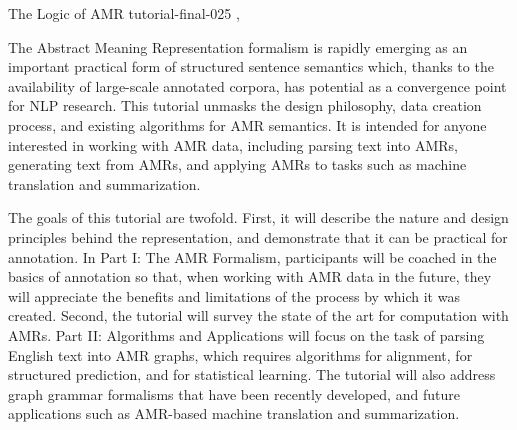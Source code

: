 \begin{tutorial}
  {The Logic of AMR}
  {tutorial-final-025}
  {\daydateyear, \tutorialmorningtime}
  {\TutLocC}

The Abstract Meaning Representation formalism is rapidly emerging as
an important practical form of structured sentence semantics which,
thanks to the availability of large-scale annotated corpora, has
potential as a convergence point for NLP research. This tutorial
unmasks the design philosophy, data creation process, and existing
algorithms for AMR semantics. It is intended for anyone interested in
working with AMR data, including parsing text into AMRs, generating
text from AMRs, and applying AMRs to tasks such as machine translation
and summarization.

The goals of this tutorial are twofold. First, it will describe the
nature and design principles behind the representation, and
demonstrate that it can be practical for annotation. In Part I: The
AMR Formalism, participants will be coached in the basics of
annotation so that, when working with AMR data in the future, they
will appreciate the benefits and limitations of the process by which
it was created. Second, the tutorial will survey the state of the art
for computation with AMRs. Part II: Algorithms and Applications will
focus on the task of parsing English text into AMR graphs, which
requires algorithms for alignment, for structured prediction, and for
statistical learning. The tutorial will also address graph grammar
formalisms that have been recently developed, and future applications
such as AMR-based machine translation and summarization.

\end{tutorial}
